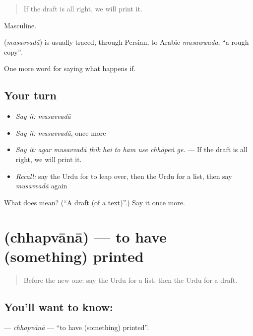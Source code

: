 \begin{quote}
If the draft is all right, we will print it.
\end{quote}

Masculine.

\begin{cousinweb}
\textbf{} (\emph{musavvadā}) is usually traced, through Persian, to Arabic \emph{musawwada}, \textquotedblleft{}a rough copy\textquotedblright{}.
\end{cousinweb}

\begin{grammarlens}[title={What you've built}]
One more word for saying what happens if.
\end{grammarlens}

\subsection*{Your turn}
\begin{itemize}
\raggedright
  \item \emph{Say it:} \emph{musavvadā}
  \item \emph{Say it:} \emph{musavvadā}, once more
  \item \emph{Say it:} \emph{agar musavvadā ṭhīk hai to ham use chhāpeṅ ge.} — If the draft is all right, we will print it.
  \item \emph{Recall:} say the Urdu for to leap over, then the Urdu for a list, then say \emph{musavvadā} again
\end{itemize}

\begin{tcolorbox}[breakable,colback=teal!4,colframe=teal!35!black,title={Before you move on}]
What does  mean? (\textquotedblleft{}A draft (of a text)\textquotedblright{}.) Say it once more.
\end{tcolorbox}
\section[\texorpdfstring{\ur{چھپوانا} (chhapvānā)}{چھپوانا (chhapvānā)}]{ (chhapvānā) — to have (something) printed}

\label{lesson:UR-C524-chhapvana}



\begin{quote}
Before the new one: say the Urdu for a list, then the Urdu for a draft.
\end{quote}

\subsection*{You'll want to know: }
\textbf{} — \emph{chhapvānā} — \textquotedblleft{}to have (something) printed\textquotedblright{}.

